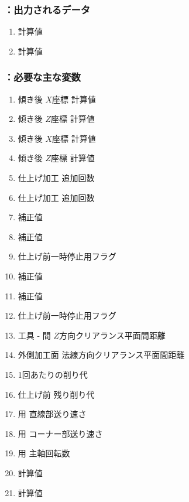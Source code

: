 \subsubsection{\DMLthreeBD：出力されるデータ}
\begin{enumerate}[label*=\sarrow]
\item \TopCurvedOutcutAngle{} 計算値
\item \BottomCurvedOutcutAngle{} 計算値
\end{enumerate}

\clearpage
\subsubsection{\KCurvedOutcutRLeft：必要な主な変数}
\begin{enumerate}[label*=\sarrow]
\item 傾き後 \TopSideCurvedOutcutCenter{} $X$座標{} 計算値
\item 傾き後 \TopSideCurvedOutcutCenter{} $Z$座標{} 計算値
\item 傾き後 \BottomSideCurvedOutcutCenter{} $X$座標{} 計算値
\item 傾き後 \BottomSideCurvedOutcutCenter{} $Z$座標{} 計算値
\item \TopOutcut{} 仕上げ加工 追加回数
\item \BottomOutcut{} 仕上げ加工 追加回数
\item \TopOutcutAsideThickness 補正値
\item \TopOutcutWidth 補正値
\item \TopOutcut{} 仕上げ前一時停止用フラグ
\item \BottomOutcutAsideThickness 補正値
\item \BottomOutcutWidth 補正値
\item \BottomOutcut{} 仕上げ前一時停止用フラグ
\item 工具 - \EndFace 間 $Z$方向クリアランス平面間距離
\item 外側加工面 法線方向クリアランス平面間距離
\item \OutcutMilling1回あたりの削り代
\item \OutcutMilling{} 仕上げ前 残り削り代
\item \OutcutMilling 用 直線部送り速さ
\item \OutcutMilling 用 コーナー部送り速さ
\item \OutcutMilling 用 主軸回転数
\item \TopCurvedOutcutAngle{} 計算値
\item \BottomCurvedOutcutAngle{} 計算値
\end{enumerate}


